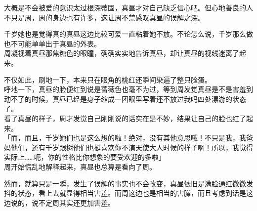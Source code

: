 大概是不会被爱的意识太过根深蒂固，真昼才对自己缺乏信心吧。但心地善良的人不只是周，周的身边也有许多，这让周不禁感叹真昼的误解之深。

千岁她也是觉得真的真昼这边比较可爱一直粘着她不放。不论怎么说，千岁那么做也不可能单单出于真昼的外表。\\

周凝视着真昼那焦糖色的眼瞳，确确实实地告诉真昼，却让真昼的视线迷离了起来。

不仅如此，刷地一下，本来只在眼角的桃红还瞬间染遍了整只脸蛋。\\

呼地一下，真昼的脸便红到说是蔷薇色也毫不为过，等到周发觉真昼是不是害羞到动不了的时候，真昼已经是身子缩成一团眼里写着还不放过我吗四处漂游的状态了。\\

看了真昼的样子，周才发觉自己刚刚说的话实在是不妙，结果让自己的脸也红了起来。\\

「而，而且，千岁她们也是这么想的啦！绝对，没有其他意思哦！不只是我，我爸妈他们，还有千岁跟树他们也挺喜欢你不演天使大人时候的样子啊！所以，我觉得实际上……呃，你的性格比你想象的要受欢迎的多啦」\\

周开始慌乱地解释起来，真昼也总算是看向了周。

然而，就算只是一瞬，发生了误解的事实也不会改变，真昼依旧是满脸通红微微发抖的状态，看上去就显得相当害羞。而周这边也是相当的害臊，而且考虑到话是这边说的，说不定周其实还更加害羞。\\

